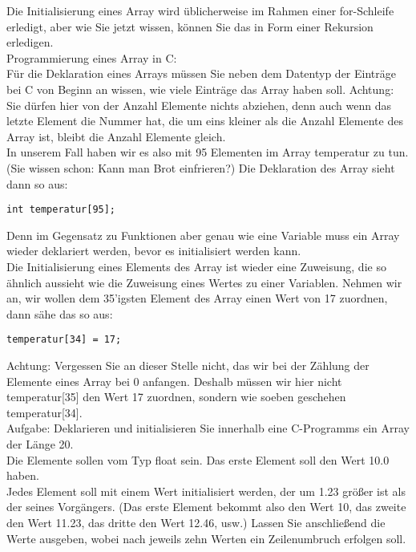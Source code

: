 Die Initialisierung eines Array wird üblicherweise im Rahmen einer for-Schleife erledigt, aber wie Sie jetzt wissen, können Sie das in Form einer Rekursion erledigen.\\

Programmierung eines Array in C:\\

Für die Deklaration eines Arrays müssen Sie neben dem Datentyp der Einträge bei C von Beginn an wissen, wie viele Einträge das Array haben soll. Achtung: Sie dürfen hier von der Anzahl Elemente nichts abziehen, denn auch wenn das letzte Element die Nummer hat, die um eins kleiner als die Anzahl Elemente des Array ist, bleibt die Anzahl Elemente gleich.\\

In unserem Fall haben wir es also mit 95 Elementen im Array temperatur zu tun. (Sie wissen schon: Kann man Brot einfrieren?) Die Deklaration des Array sieht dann so aus:\\

\begin{verbatim}
int temperatur[95];
\end{verbatim}

Denn im Gegensatz zu Funktionen aber genau wie eine Variable muss ein Array wieder deklariert werden, bevor es initialisiert werden kann.\\

Die Initialisierung eines Elements des Array ist wieder eine Zuweisung, die so ähnlich aussieht wie die Zuweisung eines Wertes zu einer Variablen. Nehmen wir an, wir wollen dem 35’igsten Element des Array einen Wert von 17 zuordnen, dann sähe das so aus:\\

\begin{verbatim}
temperatur[34] = 17;
\end{verbatim}

Achtung: Vergessen Sie an dieser Stelle nicht, das wir bei der Zählung der Elemente eines Array bei 0 anfangen. Deshalb müssen wir hier nicht temperatur[35] den Wert 17 zuordnen, sondern wie soeben geschehen temperatur[34].\\

Aufgabe: Deklarieren und initialisieren Sie innerhalb eine C-Programms ein Array der Länge 20.\\

Die Elemente sollen vom Typ float sein.
Das erste Element soll den Wert 10.0 haben.\\
Jedes Element soll mit einem Wert initialisiert werden, der um 1.23 größer ist als der seines Vorgängers. (Das erste Element bekommt also den Wert 10, das zweite den Wert 11.23, das dritte den Wert 12.46, usw.)
Lassen Sie anschließend die Werte ausgeben, wobei nach jeweils zehn Werten ein Zeilenumbruch erfolgen soll.\\

